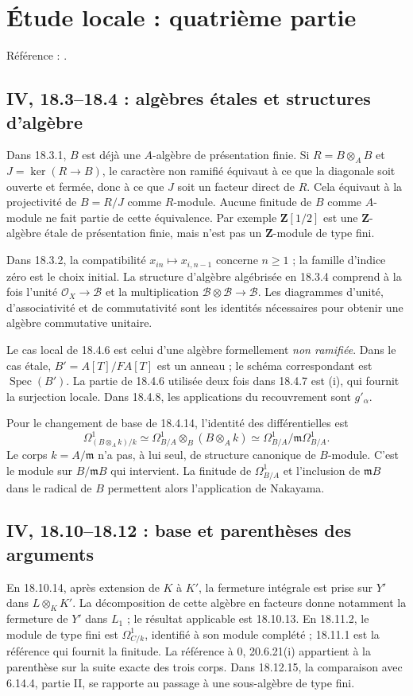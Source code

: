 \documentclass[11pt,a4paper]{article}
\begin{document}
\section{Étude locale : quatrième partie}
\label{part:iv4}
Référence : \cite{EGAIV4}.
\subsection{IV, 18.3--18.4 : algèbres étales et structures d’algèbre}
\label{note:iv4-unramified}
Dans 18.3.1, $B$ est déjà une $A$-algèbre de présentation finie.
Si $R=B\otimes_A B$ et $J=\ker(R\to B)$, le caractère non ramifié
équivaut à ce que la diagonale soit ouverte et fermée, donc à ce que
$J$ soit un facteur direct de $R$. Cela équivaut à la projectivité
de $B=R/J$ comme $R$-module. Aucune finitude de $B$ comme $A$-module
ne fait partie de cette équivalence. Par exemple $\mathbf Z[1/2]$
est une $\mathbf Z$-algèbre étale de présentation finie, mais n'est
pas un $\mathbf Z$-module de type fini.

Dans 18.3.2, la compatibilité $x_{in}\mapsto x_{i,n-1}$ concerne
$n\geq1$ ; la famille d'indice zéro est le choix initial.
La structure d'algèbre algébrisée en 18.3.4 comprend à la fois
l'unité $\mathcal O_X\to\mathcal B$ et la multiplication
$\mathcal B\otimes\mathcal B\to\mathcal B$. Les diagrammes d'unité,
d'associativité et de commutativité sont les identités nécessaires
pour obtenir une algèbre commutative unitaire.

Le cas local de 18.4.6 est celui d'une algèbre formellement
\emph{non ramifiée}. Dans le cas étale, $B'=A[T]/FA[T]$ est un
anneau ; le schéma correspondant est $\operatorname{Spec}(B')$.
La partie de 18.4.6 utilisée deux fois dans 18.4.7 est (i), qui fournit
la surjection locale. Dans 18.4.8, les applications du recouvrement
sont $g'_\alpha$.

Pour le changement de base de 18.4.14, l'identité des différentielles est
\[
 \Omega^1_{(B\otimes_A k)/k}
   \simeq \Omega^1_{B/A}\otimes_B(B\otimes_A k)
   \simeq \Omega^1_{B/A}/\mathfrak m\Omega^1_{B/A}.
\]
Le corps $k=A/\mathfrak m$ n'a pas, à lui seul, de structure canonique
de $B$-module. C'est le module sur $B/\mathfrak mB$ qui intervient.
La finitude de $\Omega^1_{B/A}$ et l'inclusion de $\mathfrak mB$ dans
le radical de $B$ permettent alors l'application de Nakayama.

\subsection{IV, 18.10--18.12 : base et parenthèses des arguments}
\label{note:iv4-normalization}
En 18.10.14, après extension de $K$ à $K'$, la fermeture intégrale
est prise sur $Y'$ dans $L\otimes_K K'$. La décomposition de cette
algèbre en facteurs donne notamment la fermeture de $Y'$ dans
$L_1$ ; le résultat applicable est 18.10.13.
En 18.11.2, le module de type fini est $\Omega^1_{C/k}$,
identifié à son module complété ; 18.11.1 est la référence qui
fournit la finitude. La référence à 0, 20.6.21(i) appartient à la
parenthèse sur la suite exacte des trois corps.
Dans 18.12.15, la comparaison avec 6.14.4, partie II, se rapporte
au passage à une sous-algèbre de type fini.
\end{document}
